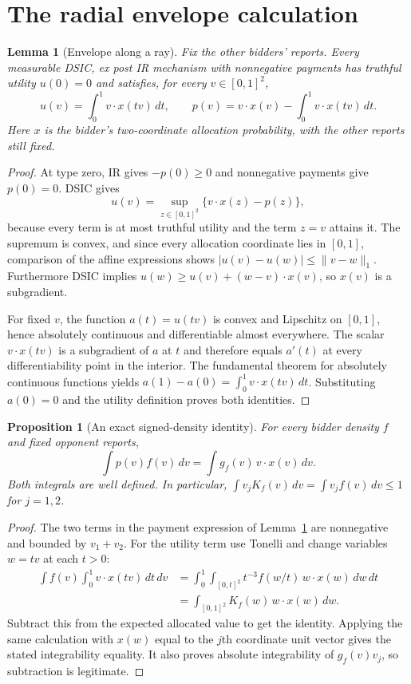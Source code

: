 \documentclass[11pt]{article}
\newtheorem{proposition}[theorem]{Proposition}
\newtheorem{lemma}[theorem]{Lemma}
\theoremstyle{definition}
\begin{document}
\section{The radial envelope calculation}
\begin{lemma}[Envelope along a ray]\label{ray}
Fix the other bidders' reports. Every measurable DSIC, ex post IR mechanism
with nonnegative payments has truthful utility $u(0)=0$ and satisfies,
for every $v\in[0,1]^2$,
\[
 u(v)=\int_0^1 v\cdot x(tv)\,dt,
 \qquad p(v)=v\cdot x(v)-\int_0^1v\cdot x(tv)\,dt.
\]
Here $x$ is the bidder's two-coordinate allocation probability, with the
other reports still fixed.
\end{lemma}
\begin{proof}
At type zero, IR gives $-p(0)\ge0$ and nonnegative payments give $p(0)=0$.
DSIC gives
\[
 u(v)=\sup_{z\in[0,1]^2}\{v\cdot x(z)-p(z)\},
\]
because every term is at most truthful utility and the term $z=v$
attains it. The supremum is convex, and since every allocation coordinate
lies in $[0,1]$, comparison of the affine expressions shows
$|u(v)-u(w)|\le\|v-w\|_1$. Furthermore DSIC implies
$u(w)\ge u(v)+(w-v)\cdot x(v)$, so $x(v)$ is a subgradient.

For fixed $v$, the function $a(t)=u(tv)$ is convex and Lipschitz on
$[0,1]$, hence absolutely continuous and differentiable almost everywhere.
The scalar $v\cdot x(tv)$ is a subgradient of $a$ at $t$ and therefore
equals $a'(t)$ at every differentiability point in the interior. The
fundamental theorem for absolutely continuous functions yields
$a(1)-a(0)=\int_0^1v\cdot x(tv)\,dt$. Substituting $a(0)=0$ and the
utility definition proves both identities.
\end{proof}
\begin{proposition}[An exact signed-density identity]\label{identity}
For every bidder density $f$ and fixed opponent reports,
\[
 \int p(v)f(v)\,dv
 =\int g_f(v)\,v\cdot x(v)\,dv.
\]
Both integrals are well defined. In particular,
$\int v_jK_f(v)\,dv=\int v_jf(v)\,dv\le1$ for $j=1,2$.
\end{proposition}
\begin{proof}
The two terms in the payment expression of Lemma~\ref{ray} are nonnegative
and bounded by $v_1+v_2$. For the utility term use Tonelli and change
variables $w=tv$ at each $t>0$:
\begin{align*}
 \int f(v)\int_0^1v\cdot x(tv)\,dt\,dv
 &=\int_0^1\int_{[0,t]^2}
 t^{-3}f(w/t)\,w\cdot x(w)\,dw\,dt\\
 &=\int_{[0,1]^2}K_f(w)\,w\cdot x(w)\,dw.
\end{align*}
Subtract this from the expected allocated value to get the identity.
Applying the same calculation with $x(w)$ equal to the $j$th coordinate
unit vector gives the stated integrability equality. It also proves
absolute integrability of $g_f(v)v_j$, so subtraction is legitimate.
\end{proof}
\end{document}
